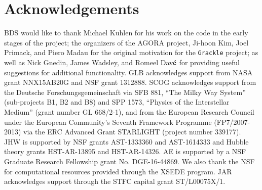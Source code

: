 \section*{Acknowledgements}

BDS would like to thank Michael Kuhlen for his work on the code in the
early stages of the project; the organizers of the AGORA project,
Ji-hoon Kim, Joel Primack, and Piero Madau for the original motivation
for the \texttt{Grackle} project; as well as Nick Gnedin, James
Wadsley, and Romeel Dav$\acute{\rm e}$ for providing useful
suggestions for additional functionality.  GLB acknowledges support
from NASA grant NNX15AB20G and NSF grant 1312888. SCOG acknowledges
support from the Deutsche Forschungsgemeinschaft via SFB 881, ``The
Milky Way System'' (sub-projects B1, B2 and B8) and SPP 1573,
``Physics of the Interstellar Medium'' (grant number GL 668/2-1), and
from the European Research Council under the European Community's
Seventh Framework Programme (FP7/2007-2013) via the ERC Advanced Grant
STARLIGHT (project number 339177).  JHW is supported by NSF grants
AST-1333360 and AST-1614333 and Hubble theory grants HST-AR-13895 and
HST-AR-14326.  AE is supported by a NSF Graduate Research Fellowship
grant No. DGE-16-44869. We also thank the NSF for computational
resources provided through the XSEDE program. JAR acknowledges support
through the STFC capital grant ST/L00075X/1.

